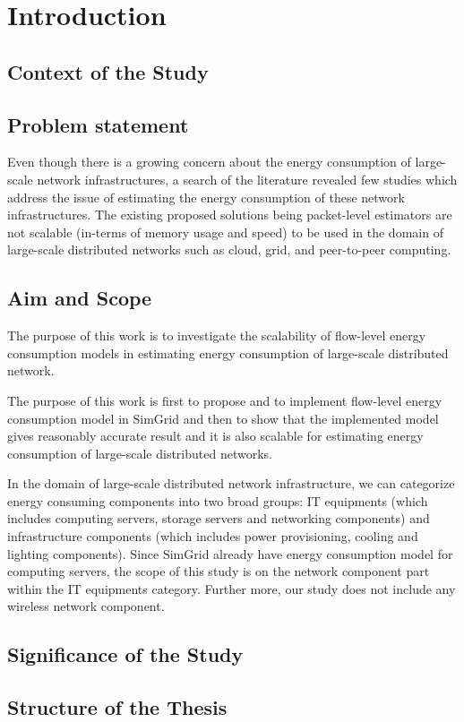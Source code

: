 \chapter{Introduction}
\label{chapter:intro}

\section{Context of the Study}
	 

\section{Problem statement}
Even though there is a growing concern about the energy consumption of large-scale network infrastructures, a search of the literature revealed few studies which address the issue of estimating the energy consumption of these network infrastructures. The existing proposed solutions being packet-level estimators are not scalable (in-terms of memory usage and speed) to be used in the domain of large-scale distributed networks such as cloud, grid, and peer-to-peer computing. 

\section{Aim and Scope}

The purpose of this work is to investigate the scalability of flow-level energy consumption models in estimating energy consumption of large-scale distributed network. 

The purpose of this work is first to propose and to implement flow-level energy consumption model in SimGrid and then to show that the implemented model gives reasonably accurate result and it is also scalable for estimating energy consumption of large-scale distributed networks.

In the domain of large-scale distributed network infrastructure, we can categorize energy consuming components into two broad groups: IT equipments (which includes computing servers, storage servers and networking components) and infrastructure components (which includes power provisioning, cooling and lighting components). Since SimGrid already have energy consumption model for computing servers, the scope of this study is on the network component part within the IT equipments category. Further more, our study does not include any wireless network component. 

\section{Significance of the Study}

\section{Structure of the Thesis}
\label{section:structure} 


